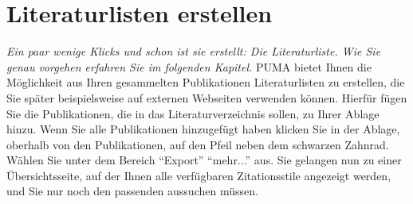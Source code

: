 \documentclass[b5paper,11pt,twoside]{scrbook} %
\begin{document}
\section{Literaturlisten erstellen}
\textit{Ein paar wenige Klicks und schon ist sie erstellt: Die Literaturliste. Wie Sie genau vorgehen erfahren Sie im folgenden Kapitel.}\newline
\newline
PUMA bietet Ihnen die Möglichkeit aus Ihren gesammelten Publikationen Literaturlisten zu erstellen, die Sie später beispielsweise auf externen Webseiten verwenden können. \newline
Hierfür fügen Sie die Publikationen, die in das Literaturverzeichnis sollen, zu Ihrer Ablage hinzu. Wenn Sie alle Publikationen hinzugefügt haben klicken Sie in der Ablage, oberhalb von den Publikationen, auf den Pfeil neben dem schwarzen Zahnrad. Wählen Sie unter dem Bereich \enquote{Export} \enquote{mehr...} aus. Sie gelangen nun zu einer Übersichtsseite, auf der Ihnen alle verfügbaren Zitationsstile angezeigt werden, und Sie nur noch den passenden aussuchen müssen. 
\end{document}
